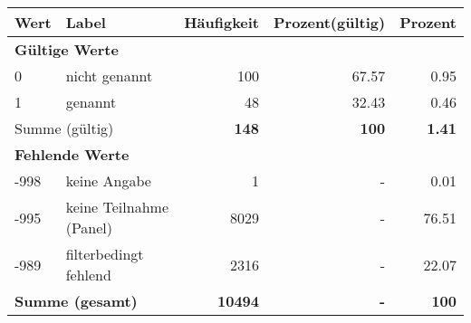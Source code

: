      \begin{longtable}{lXrrr}
     \toprule
     \textbf{Wert} & \textbf{Label} & \textbf{Häufigkeit} & \textbf{Prozent(gültig)} & \textbf{Prozent} \\
     \endhead
     \midrule
     \multicolumn{5}{l}{\textbf{Gültige Werte}}\\

     0 &
     \multicolumn{1}{X}{ nicht genannt   } &


       \num{100} &
       \num[round-mode=places,round-precision=2]{67,57} &
         \num[round-mode=places,round-precision=2]{0,95} \\

     1 &
     \multicolumn{1}{X}{ genannt   } &


       \num{48} &
       \num[round-mode=places,round-precision=2]{32,43} &
         \num[round-mode=places,round-precision=2]{0,46} \\
     \midrule
     \multicolumn{2}{l}{Summe (gültig)} &
       \textbf{\num{148}} &
     \textbf{100} &
       \textbf{\num[round-mode=places,round-precision=2]{1,41}} \\
     \multicolumn{5}{l}{\textbf{Fehlende Werte}}\\
       -998 &
       keine Angabe &
         \num{1} &
        - &
         \num[round-mode=places,round-precision=2]{0,01} \\
       -995 &
       keine Teilnahme (Panel) &
         \num{8029} &
        - &
         \num[round-mode=places,round-precision=2]{76,51} \\
       -989 &
       filterbedingt fehlend &
         \num{2316} &
        - &
         \num[round-mode=places,round-precision=2]{22,07} \\
     \midrule
     \multicolumn{2}{l}{\textbf{Summe (gesamt)}} &
          \textbf{\num{10494}} &
        \textbf{-} &
        \textbf{100} \\
     \bottomrule
     \end{longtable}
     
